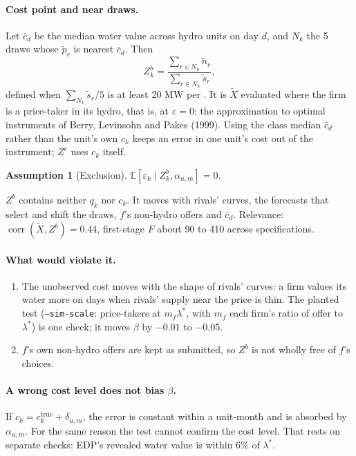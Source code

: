\documentclass[11pt]{article}
\newtheorem*{assumption}{Assumption}
\newcommand{\E}{\mathbb{E}}
\newcommand{\Xt}{\tilde X}
\newcommand{\eur}{\text{\texteuro}}
\newcommand{\code}[1]{\texttt{\small #1}}
\begin{document}
\paragraph{Cost point and near draws.} Let $\bar c_d$ be the median water value across hydro
units on day $d$, and $N_k$ the 5 draws whose $\tilde p_r$ is nearest $\bar c_d$. Then
\[
  Z^b_k = \frac{\sum_{r \in N_k} \tilde n_r}{\sum_{r \in N_k} \tilde s_r},
\]
defined when $\sum_{N_k} \tilde s_r / 5$ is at least 20 MW per \eur. It is $\Xt$ evaluated
where the firm is a price-taker in its hydro, that is, at $\varepsilon = 0$: the
approximation to optimal instruments of Berry, Levinsohn and Pakes (1999). Using the class
median $\bar c_d$ rather than the unit's own $c_k$ keeps an error in one unit's cost out of
the instrument; $Z^c$ uses $c_k$ itself.

\begin{assumption}[Exclusion]
$\E[\varepsilon_k \mid Z^b_k, \alpha_{u,m}] = 0$.
\end{assumption}

\noindent $Z^b$ contains neither $q_k$ nor $c_k$. It moves with rivals' curves, the forecasts
that select and shift the draws, $f$'s non-hydro offers and $\bar c_d$. Relevance:
$\operatorname{corr}(\Xt, Z^b) = 0.44$, first-stage $F$ about 90 to 410 across specifications.

\paragraph{What would violate it.}
\begin{enumerate}
  \item The unobserved cost moves with the shape of rivals' curves: a firm values its water
    more on days when rivals' supply near the price is thin. The planted test
    (\code{--sim-scale}: price-takers at $m_f\lambda^*$, with $m_f$ each firm's ratio of
    offer to $\lambda^*$) is one check; it moves $\beta$ by $-0.01$ to $-0.05$.
  \item $f$'s own non-hydro offers are kept as submitted, so $Z^b$ is not wholly free of
    $f$'s choices.
\end{enumerate}

\paragraph{A wrong cost level does not bias $\beta$.} If $c_k = c_k^{\text{true}} +
\delta_{u,m}$, the error is constant within a unit-month and is absorbed by $\alpha_{u,m}$. For
the same reason the test cannot confirm the cost level. That rests on separate checks:
EDP's revealed water value is within 6\% of $\lambda^*$.
\end{document}
